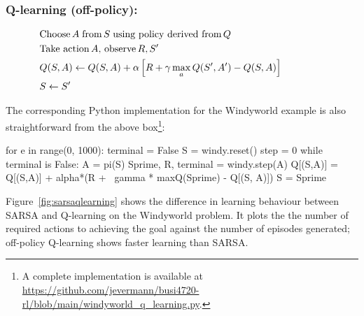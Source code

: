 \begin{tcolorbox}[colback=code]
\setlength{\abovedisplayskip}{0pt}
\setlength{\belowdisplayskip}{0pt}
\setlength{\abovedisplayshortskip}{0pt}
\setlength{\belowdisplayshortskip}{0pt}
\subsubsection*{Q-learning (off-policy):}

\begin{align*}
& \text{Choose} \, A \; \text{from}\, S \; \text{using policy derived from} \, Q \\
& \text{Take action}\, A, \, \text{observe} \, R, S' \\
&  Q(S, A) \leftarrow Q(S, A) + \alpha \left[ R + \gamma \operatorname*{max}_a Q(S', A') - Q(S, A) \right] \hspace{.6in}\\
& S \leftarrow S'
\end{align*}
\end{tcolorbox}

The corresponding Python implementation for the Windyworld example is also straightforward from the above box\footnote{A complete implementation is available at \url{https://github.com/jevermann/busi4720-rl/blob/main/windyworld_q_learning.py}.}:

\begin{samepage}
\begin{pythoncode}
for e in range(0, 1000):
    terminal = False
    S = windy.reset()
    step = 0
    while terminal is False:
        A = pi(S)
        Sprime, R, terminal = windy.step(A)
        Q[(S,A)] = Q[(S,A)] + alpha*(R + \
            gamma * maxQ(Sprime) - Q[(S, A)])
        S = Sprime
\end{pythoncode}
\end{samepage}

Figure~\ref{fig:sarsaqlearning} shows the difference in learning behaviour between SARSA and Q-learning on the Windyworld problem. It plots the the number of required actions to achieving the goal against the number of episodes generated; off-policy Q-learning shows faster learning than SARSA.

